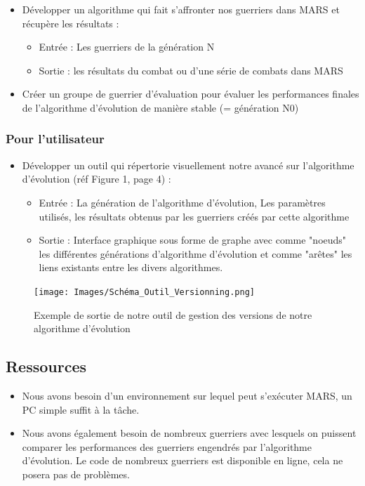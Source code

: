 \documentclass{article}
\begin{document}
\begin{itemize}
                \item Développer un algorithme qui fait s’affronter nos guerriers dans MARS et récupère les résultats :
                \begin{itemize}
                    \item Entrée : Les guerriers de la génération N
                    \item Sortie : les résultats du combat ou d’une série de combats dans MARS
                \end{itemize}
                \item Créer un groupe de guerrier d’évaluation pour évaluer les performances finales de l’algorithme d’évolution de manière stable (= génération N0)
            \end{itemize}

    \subsubsection{Pour l'utilisateur}
        \begin{itemize}
            \item Développer un outil qui répertorie visuellement notre avancé sur l’algorithme d’évolution (réf Figure 1, page 4) :
            \begin{itemize}
                \item Entrée : La génération de l’algorithme d’évolution, Les paramètres utilisés, les résultats obtenus par les guerriers créés par cette algorithme
                \item Sortie : Interface graphique sous forme de graphe avec comme "noeuds" les différentes générations d'algorithme d'évolution et comme "arêtes" les liens existants entre les divers algorithmes.
            \end{itemize}
        \end{itemize}
\newpage
             \begin{figure}
                \centerline{\texttt{[image: Images/Schéma\_Outil\_Versionning.png]}}
                \caption{Exemple de sortie de notre outil de gestion des versions de notre algorithme d'évolution} 
            \end{figure}
\newpage
           
            
    \subsection{Ressources}
        \begin{itemize}
            \item Nous avons besoin d'un environnement sur lequel peut s'exécuter MARS, un PC simple suffit à la tâche. 
            \item Nous avons également besoin de nombreux guerriers avec lesquels on puissent comparer les performances des guerriers engendrés par l'algorithme d'évolution. Le code de nombreux guerriers est disponible en ligne, cela ne posera pas de problèmes. 
        \end{itemize}
\end{document}

